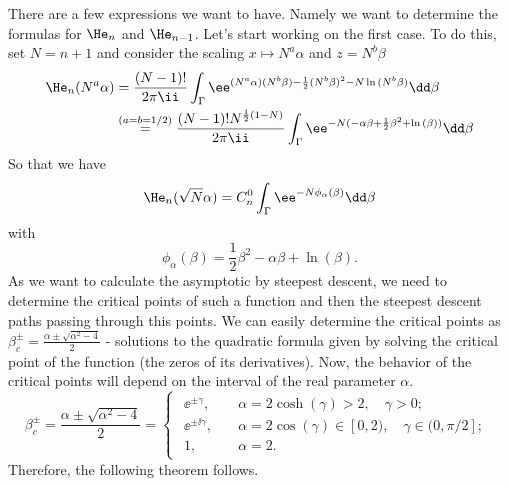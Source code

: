 There are a few expressions we want to have. Namely we want to determine the formulas for $\He_{n}$ and  $\He_{n-1}$.  Let's start working on the first case.  To do this, set $N = n + 1$ and consider the scaling $x \mapsto N^a \alpha$ and $z = N^b \beta$ 
\begin{equation}
	\begin{split}
		\He_n(N^a \alpha) & = \frac{(N-1)!}{2\pi \ii} \int_{\Gamma} \ee^{(N^a \alpha)(N^b \beta)- \frac{1}{2}(N^b \beta)^2 - N\ln{(N^b \beta)}} \dd \beta \\
		& \stackrel{(a = b = 1/2)}{=}   \frac{(N-1)! N^{\frac{1}{2}\left(1-N\right)}}{2\pi \ii} \int_{\Gamma}  \ee^{-N(- \alpha \beta+ \frac{1}{2} \beta^2 + \ln{(\beta)})} \dd \beta
	\end{split}
\end{equation}
So that we have
\begin{equation}
	\He_n(\sqrt{N}\alpha) = C_n^0 \int_{\Gamma}  \ee^{-N \phi_\alpha(\beta) } \dd \beta
	\label{Equation: Hermite Integral}
\end{equation}
with 
\begin{equation}
	\phi_\alpha(\beta) = \frac{1}{2} \beta^2 - \alpha \beta + \ln{(\beta)}.
\end{equation}
As we want to calculate the asymptotic by steepest descent, we need to determine the critical points of such a function and then the steepest descent paths passing through this points. We can easily determine the critical points as $\beta_c^\pm = \frac{\alpha \pm \sqrt{{\alpha}^2 - 4}}{2}$ - solutions to the quadratic formula given by solving the critical point of the function (the zeros of its derivatives). Now, the behavior of the critical points will depend on the interval of the real parameter $\alpha$. 
\begin{equation}
	\beta_c^{\pm} = \frac{\alpha \pm \sqrt{\alpha^2 - 4}}{2} =
	\begin{cases}
		\begin{aligned}
			\ee^{\pm \gamma}, \quad & \alpha = 2 \cosh{(\gamma)} > 2, \quad \gamma > 0; \\
			\ee^{\pm \ii \gamma}, \quad & \alpha = 2 \cos{(\gamma)} \in [0,2), \quad \gamma \in (0,\pi/2]; \\
			1, \quad & \alpha = 2.
		\end{aligned}
	\end{cases}
\end{equation}
Therefore, the following theorem follows.

